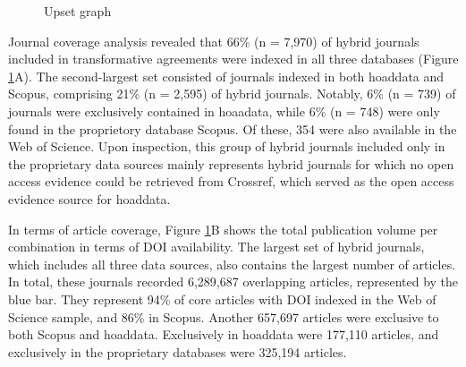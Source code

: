 \documentclass[a4paper,man,floatsintext,longtable,noextraspace,10pt]{apa6}
\begin{document}
\begin{figure}[ht!]


\caption{\label{fig-upset_coverage_results}Upset graph}

\end{figure}%

Journal coverage analysis revealed that 66\% (n = 7,970) of hybrid
journals included in transformative agreements were indexed in all three
databases (Figure \ref{fig-upset_coverage_results}A). The second-largest
set consisted of journals indexed in both hoaddata and Scopus,
comprising 21\% (n = 2,595) of hybrid journals. Notably, 6\% (n = 739)
of journals were exclusively contained in hoaadata, while 6\% (n = 748)
were only found in the proprietory database Scopus. Of these, 354 were
also available in the Web of Science. Upon inspection, this group of
hybrid journals included only in the proprietary data sources mainly
represents hybrid journals for which no open access evidence could be
retrieved from Crossref, which served as the open access evidence source
for hoaddata.

In terms of article coverage, Figure \ref{fig-upset_coverage_results}B
shows the total publication volume per combination in terms of DOI
availability. The largest set of hybrid journals, which includes all
three data sources, also contains the largest number of articles. In
total, these journals recorded 6,289,687 overlapping articles,
represented by the blue bar. They represent 94\% of core articles with
DOI indexed in the Web of Science sample, and 86\% in Scopus. Another
657,697 articles were exclusive to both Scopus and hoaddata. Exclusively
in hoaddata were 177,110 articles, and exclusively in the proprietary
databases were 325,194 articles.
\end{document}
